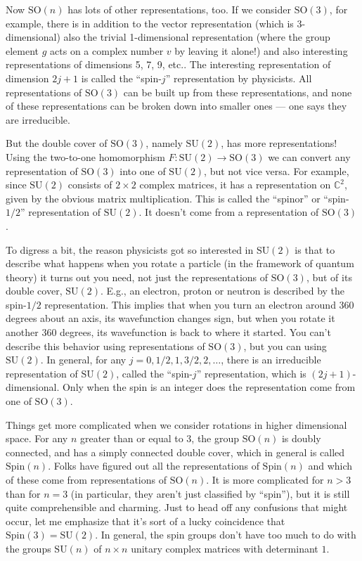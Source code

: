 \documentclass{article}
\begin{document}
Now \(\mathrm{SO}(n)\) has lots of other representations, too. If we
consider \(\mathrm{SO}(3)\), for example, there is in addition to the
vector representation (which is 3-dimensional) also the trivial
1-dimensional representation (where the group element \(g\) acts on a
complex number \(v\) by leaving it alone!) and also interesting
representations of dimensions 5, 7, 9, etc.. The interesting
representation of dimension \(2j+1\) is called the ``spin-\(j\)''
representation by physicists. All representations of \(\mathrm{SO}(3)\)
can be built up from these representations, and none of these
representations can be broken down into smaller ones --- one says they
are irreducible.

But the double cover of \(\mathrm{SO}(3)\), namely \(\mathrm{SU}(2)\),
has more representations! Using the two-to-one homomorphism
\(F\colon \mathrm{SU}(2) \to \mathrm{SO}(3)\) we can convert any
representation of \(\mathrm{SO}(3)\) into one of \(\mathrm{SU}(2)\), but
not vice versa. For example, since \(\mathrm{SU}(2)\) consists of
\(2\times2\) complex matrices, it has a representation on
\(\mathbb{C}^2\), given by the obvious matrix multiplication. This is
called the ``spinor'' or ``spin-\(1/2\)'' representation of
\(\mathrm{SU}(2)\). It doesn't come from a representation of
\(\mathrm{SO}(3)\).

To digress a bit, the reason physicists got so interested in
\(\mathrm{SU}(2)\) is that to describe what happens when you rotate a
particle (in the framework of quantum theory) it turns out you need, not
just the representations of \(\mathrm{SO}(3)\), but of its double cover,
\(\mathrm{SU}(2)\). E.g., an electron, proton or neutron is described by
the spin-\(1/2\) representation. This implies that when you turn an
electron around 360 degrees about an axis, its wavefunction changes
sign, but when you rotate it another 360 degrees, its wavefunction is
back to where it started. You can't describe this behavior using
representations of \(\mathrm{SO}(3)\), but you can using
\(\mathrm{SU}(2)\). In general, for any
\(j = 0, 1/2, 1, 3/2, 2, \ldots\), there is an irreducible
representation of \(\mathrm{SU}(2)\), called the ``spin-\(j\)''
representation, which is \((2j+1)\)-dimensional. Only when the spin is
an integer does the representation come from one of \(\mathrm{SO}(3)\).

Things get more complicated when we consider rotations in higher
dimensional space. For any \(n\) greater than or equal to 3, the group
\(\mathrm{SO}(n)\) is doubly connected, and has a simply connected
double cover, which in general is called \(\mathrm{Spin}(n)\). Folks
have figured out all the representations of \(\mathrm{Spin}(n)\) and
which of these come from representations of \(\mathrm{SO}(n)\). It is
more complicated for \(n > 3\) than for \(n = 3\) (in particular, they
aren't just classified by ``spin''), but it is still quite
comprehensible and charming. Just to head off any confusions that might
occur, let me emphasize that it's sort of a lucky coincidence that
\(\mathrm{Spin}(3) = \mathrm{SU}(2)\). In general, the spin groups don't
have too much to do with the groups \(\mathrm{SU}(n)\) of \(n\times n\)
unitary complex matrices with determinant \(1\).
\end{document}
